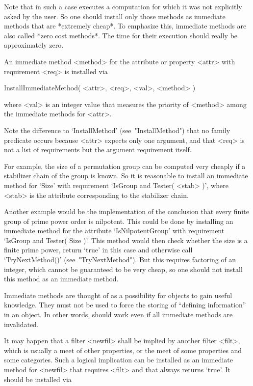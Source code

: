 Note that in such a case {\GAP} executes a computation for which
it was not explicitly asked by the user.
So one should install only those methods as immediate methods
that are *extremely cheap*.
To emphasize this, immediate methods are also called *zero cost methods*.
The time for their execution should really be approximately zero.

An immediate method <method> for the attribute or property <attr>
with requirement <req> is installed via

\>InstallImmediateMethod( <attr>, <req>, <val>, <method> )

where <val> is an integer value that measures the priority of <method>
among the immediate methods for <attr>.

Note the difference to `InstallMethod' (see~"InstallMethod")
that no family predicate occurs
because <attr> expects only one argument,
and that <req> is not a list of requirements but the argument requirement
itself.

For example, the size of a permutation group can be computed very cheaply
if a stabilizer chain of the group is known.
So it is reasonable to install an immediate method for `Size' with
requirement `IsGroup and Tester( <stab> )',
where <stab> is the attribute corresponding to the stabilizer chain.

Another example would be the implementation of the conclusion that
every finite group of prime power order is nilpotent.
This could be done by installing an immediate method for the attribute
`IsNilpotentGroup' with requirement `IsGroup and Tester( Size )'.
This method would then check whether the size is a finite prime power,
return `true' in this case and otherwise call `TryNextMethod()'
(see~"TryNextMethod").
But this requires factoring of an integer,
which cannot be guaranteed to be very cheap,
so one should not install this method as an immediate method.

Immediate methods are thought of as a possibility for objects to gain
useful knowledge.
They must not be used to force the storing of ``defining information''
in an object.
In other words, {\GAP} should work even if all immediate methods are
invalidated.


It may happen that a filter <newfil> shall be implied by another filter
<filt>, which is usually a meet of other properties,
or the meet of some properties and some categories.
Such a logical implication can be installed as an immediate method for
<newfil> that requires <filt> and that always returns `true'.
It should be installed via

